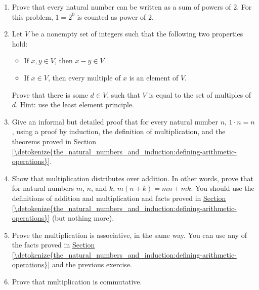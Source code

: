 \documentclass[letterpaper,10pt,english]{sphinxmanual}
\begin{document}
\begin{enumerate}
\item {} 
\sphinxAtStartPar
Prove that every natural number can be written as a sum of  powers of 2. For this problem, \(1 = 2^0\) is counted as power of 2.

\item {} 
\sphinxAtStartPar
Let \(V\) be a non\sphinxhyphen{}empty set of integers such that the following two properties hold:
\begin{itemize}
\item {} 
\sphinxAtStartPar
If \(x, y \in V\), then \(x - y \in V\).

\item {} 
\sphinxAtStartPar
If \(x \in V\), then every multiple of \(x\) is an element of \(V\).

\end{itemize}

\sphinxAtStartPar
Prove that there is some \(d \in V\), such that \(V\) is equal to the set of multiples of \(d\). Hint: use the least element principle.

\item {} 
\sphinxAtStartPar
Give an informal but detailed proof that for every natural number \(n\), \(1 \cdot n = n\), using a proof by induction, the definition of multiplication, and the theorems proved in \hyperref[\detokenize{the_natural_numbers_and_induction:defining-arithmetic-operations}]{Section \ref{\detokenize{the_natural_numbers_and_induction:defining-arithmetic-operations}}}.

\item {} 
\sphinxAtStartPar
Show that multiplication distributes over addition. In other words, prove that for natural numbers \(m\), \(n\), and \(k\), \(m (n + k) = m n + m k\). You should use the definitions of addition and multiplication and facts proved in \hyperref[\detokenize{the_natural_numbers_and_induction:defining-arithmetic-operations}]{Section \ref{\detokenize{the_natural_numbers_and_induction:defining-arithmetic-operations}}} (but nothing more).

\item {} 
\sphinxAtStartPar
Prove the multiplication is associative, in the same way. You can use any of the facts proved in \hyperref[\detokenize{the_natural_numbers_and_induction:defining-arithmetic-operations}]{Section \ref{\detokenize{the_natural_numbers_and_induction:defining-arithmetic-operations}}} and the previous exercise.

\item {} 
\sphinxAtStartPar
Prove that multiplication is commutative.


\end{enumerate}
\end{document}
